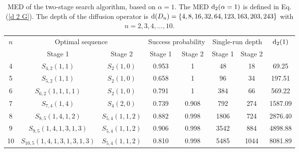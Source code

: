 \documentclass[%
 twocolumn,
 10pt,
 superscriptaddress,
 longbibliography,
 amsmath,amssymb,
 aps,
 pra,
floatfix,
]{revtex4-1}
\begin{document}
\begin{table}[h]
	\begin{ruledtabular}
	\caption{\label{Table 3} MED of the two-stage search algorithm, based on $\alpha=1$. The MED $\text d_2(\alpha=1)$ is defined in Eq. (\ref{d 2 G}). The depth of the diffusion operator is $\text d(D_n)=\{4,8,16,32,64,123,163,203,243\}$ with $n=2,3,4,\ldots,10$.}
	\begin{tabular}{cccccccc}
		
		$n$ & \multicolumn{2}{c}{Optimal sequence} & \multicolumn{2}{c}{Success probability} &  \multicolumn{2}{c}{Single-run depth} & $\text d_2(1)$  \\
		
		& Stage 1 & Stage 2 & Stage 1 & Stage 2 & Stage 1 & Stage 2 & \\ \hline
		
		4 & $S_{4,2}(1,1)$ & $S_{2}(1,0)$ & 0.953 & 1 & 48 & 18 & 69.25 \\
		
		5 & $S_{5,2}(1,1)$ & $S_{2}(1,0)$ & 0.658 & 1 & 96 & 34 & 197.51 \\
		
		6 & $S_{6,2}(1,1,1,1)$ & $S_{2}(1,0)$ & 0.791 & 1 & 384 & 66 & 569.22 \\
		
		7 & $S_{7,4}(1,4)$ & $S_{4}(2,0)$ & 0.739 & 0.908 & 792 & 274 & 1587.09 \\
		
		8 & $S_{8,5}(1,4,1,2)$ & $S_{5,4}(1,1,2)$ & 0.882 & 0.998 & 1806 & 724 & 2876.40 \\
		
		9 & $S_{9,5}(1,4,1,3,1,3)$ & $S_{5,4}(1,1,2)$ & 0.906 & 0.998 & 3542 & 884 & 4898.88 \\
		
		10 & $S_{10,5}(1,4,1,3,1,3,1,3)$ & $S_{5,4}(1,1,2)$ & 0.810 & 0.998 & 5485 & 1044 & 8081.89 \\

		
	    \end{tabular}
	\end{ruledtabular}
\end{table} 
\end{document}
